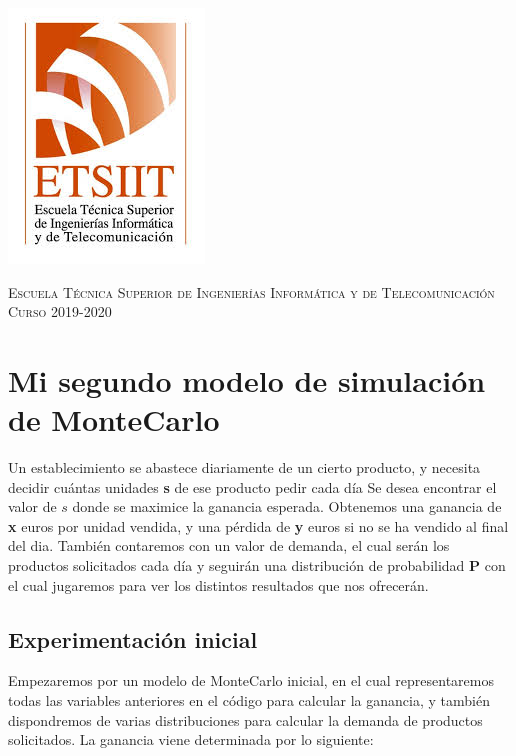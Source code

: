 \documentclass[11pt,a4paper]{report}
\begin{document}
\begin{titlepage}
\begin{minipage}{\textwidth}
\includegraphics[scale=0.3]{img/etsiit.jpeg}

\vspace{0.7cm}
\textsc{Escuela Técnica Superior de Ingenierías Informática y de Telecomunicación}\\
\vspace{1cm}
\textsc{Curso 2019-2020}
\end{minipage}
\end{titlepage}

\tableofcontents
\thispagestyle{empty}				%

\newpage

\setlength{\parskip}{1em}

\chapter{Mi segundo modelo de simulación de MonteCarlo}

Un establecimiento se abastece diariamente de un cierto producto, y necesita decidir cuántas unidades \textbf{s} de ese producto
pedir cada día Se desea encontrar el valor de $s$ donde se maximice la ganancia esperada. Obtenemos una ganancia de \textbf{x}
euros por unidad vendida, y una pérdida de \textbf{y} euros si no se ha vendido al final del dia. También contaremos con un valor
de demanda, el cual serán los productos solicitados cada día y seguirán una distribución de probabilidad \textbf{P} con el cual
jugaremos para ver los distintos resultados que nos ofrecerán.


\section{Experimentación inicial}

Empezaremos por un modelo de MonteCarlo inicial, en el cual representaremos todas las variables anteriores en el código para calcular
la ganancia, y también dispondremos de varias distribuciones para calcular la demanda de productos solicitados. La ganancia viene
determinada por lo siguiente:
\end{document}
